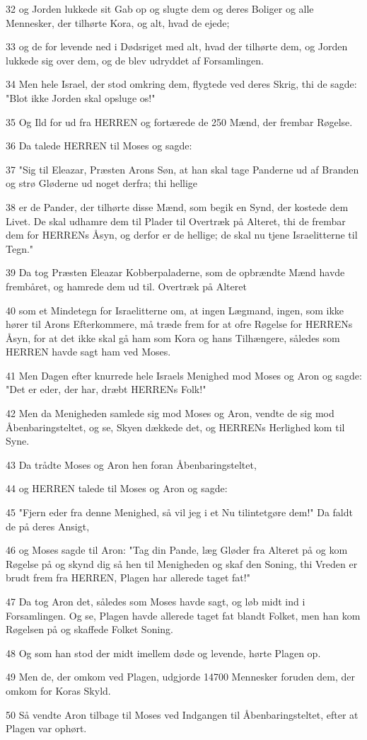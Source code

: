 \par 32 og Jorden lukkede sit Gab op og slugte dem og deres Boliger og alle Mennesker, der tilhørte Kora, og alt, hvad de ejede;
\par 33 og de for levende ned i Dødsriget med alt, hvad der tilhørte dem, og Jorden lukkede sig over dem, og de blev udryddet af Forsamlingen.
\par 34 Men hele Israel, der stod omkring dem, flygtede ved deres Skrig, thi de sagde: "Blot ikke Jorden skal opsluge os!"
\par 35 Og Ild for ud fra HERREN og fortærede de 250 Mænd, der frembar Røgelse.
\par 36 Da talede HERREN til Moses og sagde:
\par 37 "Sig til Eleazar, Præsten Arons Søn, at han skal tage Panderne ud af Branden og strø Gløderne ud noget derfra; thi hellige
\par 38 er de Pander, der tilhørte disse Mænd, som begik en Synd, der kostede dem Livet. De skal udhamre dem til Plader til Overtræk på Alteret, thi de frembar dem for HERRENs Åsyn, og derfor er de hellige; de skal nu tjene Israelitterne til Tegn."
\par 39 Da tog Præsten Eleazar Kobberpaladerne, som de opbrændte Mænd havde frembåret, og hamrede dem ud til. Overtræk på Alteret
\par 40 som et Mindetegn for Israelitterne om, at ingen Lægmand, ingen, som ikke hører til Arons Efterkommere, må træde frem for at ofre Røgelse for HERRENs Åsyn, for at det ikke skal gå ham som Kora og hans Tilhængere, således som HERREN havde sagt ham ved Moses.
\par 41 Men Dagen efter knurrede hele Israels Menighed mod Moses og Aron og sagde: "Det er eder, der har, dræbt HERRENs Folk!"
\par 42 Men da Menigheden samlede sig mod Moses og Aron, vendte de sig mod Åbenbaringsteltet, og se, Skyen dækkede det, og HERRENs Herlighed kom til Syne.
\par 43 Da trådte Moses og Aron hen foran Åbenbaringsteltet,
\par 44 og HERREN talede til Moses og Aron og sagde:
\par 45 "Fjern eder fra denne Menighed, så vil jeg i et Nu tilintetgøre dem!" Da faldt de på deres Ansigt,
\par 46 og Moses sagde til Aron: "Tag din Pande, læg Gløder fra Alteret på og kom Røgelse på og skynd dig så hen til Menigheden og skaf den Soning, thi Vreden er brudt frem fra HERREN, Plagen har allerede taget fat!"
\par 47 Da tog Aron det, således som Moses havde sagt, og løb midt ind i Forsamlingen. Og se, Plagen havde allerede taget fat blandt Folket, men han kom Røgelsen på og skaffede Folket Soning.
\par 48 Og som han stod der midt imellem døde og levende, hørte Plagen op.
\par 49 Men de, der omkom ved Plagen, udgjorde 14700 Mennesker foruden dem, der omkom for Koras Skyld.
\par 50 Så vendte Aron tilbage til Moses ved Indgangen til Åbenbaringsteltet, efter at Plagen var ophørt.

